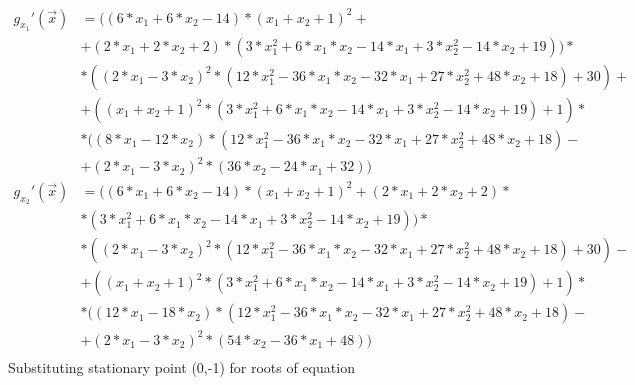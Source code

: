 \documentclass[main.tex]{subfiles}
\begin{document}
\begin{equation}
    \begin{split}
      g_{x_1}'(\vec{x}) & = ((6*x_1 + 6*x_2 - 14)*(x_1 + x_2 + 1)^2 + \\
      & + (2*x_1 + 2*x_2 + 2)*(3*x_1^2 + 6*x_1*x_2 - 14*x_1 + 3*x_2^2 - 14*x_2 + 19))*\\
      & * ((2*x_1 - 3*x_2)^2*(12*x_1^2 - 36*x_1*x_2 - 32*x_1 + 27*x_2^2 + 48*x_2 + 18) + 30) + \\
      & + ((x_1 + x_2 + 1)^2*(3*x_1^2 + 6*x_1*x_2 - 14*x_1 + 3*x_2^2 - 14*x_2 + 19) + 1)*\\
      & * ((8*x_1 - 12*x_2)*(12*x_1^2 - 36*x_1*x_2 - 32*x_1 + 27*x_2^2 + 48*x_2 + 18) -\\
      & + (2*x_1 - 3*x_2)^2*(36*x_2 - 24*x_1 + 32))\\
      g_{x_2}'(\vec{x}) & = ((6*x_1 + 6*x_2 - 14)*(x_1 + x_2 + 1)^2 + (2*x_1 + 2*x_2 + 2)* \\
      & * (3*x_1^2 + 6*x_1*x_2 - 14*x_1 + 3*x_2^2 - 14*x_2 + 19))*\\
      & * ((2*x_1 - 3*x_2)^2*(12*x_1^2 - 36*x_1*x_2 - 32*x_1 + 27*x_2^2 + 48*x_2 + 18) + 30) -\\
      & + ((x_1 + x_2 + 1)^2*(3*x_1^2 + 6*x_1*x_2 - 14*x_1 + 3*x_2^2 - 14*x_2 + 19) + 1)*\\
      & * ((12*x_1 - 18*x_2)*(12*x_1^2 - 36*x_1*x_2 - 32*x_1 + 27*x_2^2 + 48*x_2 + 18) -\\
      & + (2*x_1 - 3*x_2)^2*(54*x_2 - 36*x_1 + 48))\\
    \end{split}
\end{equation}
Substituting stationary point (0,-1) for roots of equation
\end{document}
